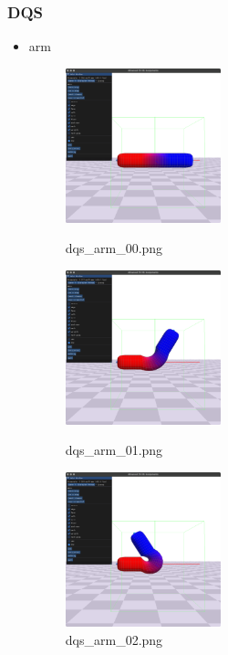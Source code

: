\documentclass[a4paper,10pt,uplatex,dvipdfmx]{jsarticle}
\begin{document}
\subsubsection{DQS}
\begin{itemize}
  \item arm
  \begin{figure}[H]
    \begin{minipage}{0.33\hsize}
      \begin{center}
        \includegraphics[width=45mm]{img/dqs_arm_00.png}
        \caption{dqs\_arm\_00.png}
      \end{center}
    \end{minipage}
    \begin{minipage}{0.33\hsize}
      \begin{center}
        \includegraphics[width=45mm]{img/dqs_arm_01.png}
        \caption{dqs\_arm\_01.png}
      \end{center}
    \end{minipage}
    \begin{minipage}{0.33\hsize}
      \begin{center}
        \includegraphics[width=45mm]{img/dqs_arm_02.png}
        \caption{dqs\_arm\_02.png}
      \end{center}
    \end{minipage}
  \end{figure}
  

\end{itemize}
\end{document}
